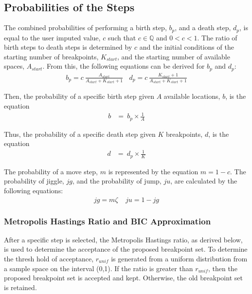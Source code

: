 \documentclass[submit]{smj}
\begin{document}
\subsection{Probabilities of the Steps}
The combined probabilities of performing a birth step, $b_p$, and a death step, $d_p$, is equal to the user imputed value, $c$ such that $c \in \mathbb{Q}$ and $0 < c < 1$. The ratio of birth steps to death steps is determined by $c$ and the initial conditions of the starting number of breakpoints, $K_{start}$, and the starting number of available spaces, $A_{start}$. From this, the following equations can be derived for $b_p$ and $d_p$: 
\begin{align*}
b_p = c  \ \frac{A_{start}}{A_{start}+ K_{start}+1}  \ \ \ \ d_p = c \  \frac{K_{start}+1}{A_{start}+ K_{start}+1}
\end{align*}

Then, the probability of a specific birth step given $A$ available locations, $b$, is the equation 
\begin{align*}
b &= \ b_p \times \frac{1}{A}
\end{align*}

Thus, the probability of a specific death step given $K$ breakpoints, $d$, is the equation
\begin{align*}
d &= \ d_p \times \frac{1}{K}
\end{align*}

The probability of a move step, $m$ is represented by the equation $m = 1-c$. The probability of jiggle, $jg$, and the probability of jump, $ju$, are calculated by the following equations: 
\begin{align*}
jg = m\zeta \ \ \ \ \ ju = 1-jg
\end{align*}

\subsubsection{Metropolis Hastings Ratio and BIC Approximation} 
After a specific step is selected, the Metropolis Hastings ratio, as derived below, is used to determine the acceptance of the proposed breakpoint set. To determine the thresh hold of acceptance,  $r_{unif}$ is generated from a uniform distribution from a sample space on the interval (0,1). If the ratio is greater than $r_{unif}$, then the proposed breakpoint set is accepted and kept. Otherwise, the old breakpoint set is retained. 
\end{document}
